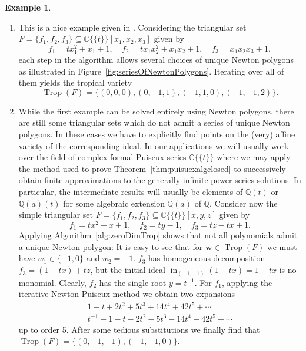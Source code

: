 \documentclass[
  paper=a4,
  titlepage,
  bibliography=totoc,
  pagesize=pdftex
]{scrartcl}
\numberwithin{figure}{section}
\numberwithin{equation}{section}
\numberwithin{table}{section}
\newcommand*\setC{\mathds{C}}
\newcommand*\setQ{\mathds{Q}}
\newcommand*\puiseux[2]{#1\{\!\{#2\}\!\}}
\newcommand*\CCt{\puiseux{\setC}{t}}
\let\vec\mathbf
\DeclareMathOperator{\Trop}{Trop}
\DeclareMathOperator{\initial}{in}
\theoremstyle{definition}
\newtheorem{example}[definition]{Example}
\numberwithin{definition}{section}
\begin{document}
\begin{example} \label{ex:zeroDimTrop}\
  \begin{enumerate}
    \item This is a nice example given in \cite[Example~2.13]{tropPointsLinks}.
      Considering the triangular set $F = \{ f_1, f_2, f_3 \} \subseteq \CCt[x_1, x_2,
      x_3]$ given by
      \[
        f_1 = tx_1^2 + x_1 + 1, \quad
        f_2 = tx_1x_2^2 + x_1x_2 + 1, \quad
        f_3 = x_1x_2x_3+1,
      \]
      each step in the algorithm allows several choices of unique Newton polygons as
      illustrated in Figure~\ref{fig:seriesOfNewtonPolygons}. Iterating over all of them
      yields the tropical variety
      \[
        \Trop(F) = \{ (0,0,0), (0,-1,1), (-1,1,0),(-1,-1,2) \}.
      \]
    \item While the first example can be solved entirely using Newton polygons, there are
      still some triangular sets which do not admit a series of unique Newton polygons. In
      these cases we have to explicitly find points on the (very) affine variety of the
      corresponding ideal. In our applications we will usually work over the field of
      complex formal Puiseux series $\CCt$ where we may apply the method used to prove
      Theorem~\ref{thm:puisuexalgclosed} to successively obtain finite approximations to
      the generally infinite power series solutions. In particular, the intermediate
      results will usually be elements of $\setQ(t)$ or $\setQ(a)(t)$ for some algebraic
      extension $\setQ(a)$ of $\setQ$. Consider now the simple triangular set $F = \{ f_1,
      f_2, f_3 \} \subseteq \CCt[x,y,z]$ given by
      \[
        f_1 = tx^2 - x + 1, \quad
        f_2 = ty - 1, \quad
        f_3 = tz - tx + 1.
      \]
      Applying Algorithm~\ref{alg:zeroDimTrop} shows that not all polynomials admit a
      unique Newton polygon: It is easy to see that for $\vec w \in \Trop(F)$ we must have
      $w_1 \in \{ -1, 0 \}$ and $w_2 = -1$. $f_3$ has homogeneous decomposition $f_3 = (1
      - tx) + tz$, but the initial ideal $\initial_{(-1,-1)}(1-tx) = 1-tx$ is no monomial.
      Clearly, $f_2$ has the single root $y = t^{-1}$. For $f_1$, applying the iterative
      Newton-Puiseux method we obtain two expansions
      \begin{align*}
        1 + t + 2t^2 + 5t^3 + 14t^4 + 42 t^5 + \cdots \\
        t^{-1} - 1 - t - 2t^2 - 5t^3 - 14t^4 - 42t^5 + \cdots
      \end{align*}
      up to order 5. After some tedious substitutions we finally find that $\Trop(F) = \{
      (0,-1,-1), (-1,-1,0) \}$.
      \label{ex:zdt2}
  \end{enumerate}
\end{example}
\end{document}
